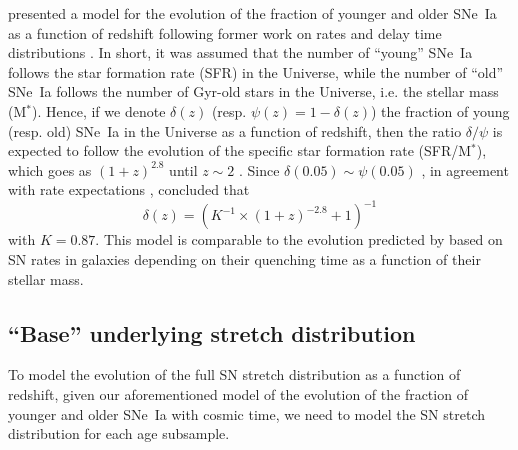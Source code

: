 \documentclass[]{aa} %
\newcommand{\nn}[1]{{\textcolor[rgb]{0.25, 0.50, 0}{#1}}}
\begin{document}
\cite{rigault2018} presented a model for the evolution of the fraction of
younger and older SNe~Ia as a function of redshift following former work on
rates and delay time distributions \citep[e.g.,][]{mannucci2005,
scannapieco2005, sullivan2006, aubourg2008, childress2014, maozmannucci2014}.
In short, it was assumed that the number of ``young'' SNe~Ia follows the star
formation \nn{rate} (SFR) in the Universe, while the number of ``old'' SNe~Ia
follows the number of Gyr-old stars in the Universe, i.e. the stellar mass
(M$^*$). Hence, if we denote $\delta(z)$ (resp. $\psi(z) = 1-\delta(z)$) the
fraction of young (resp. old) SNe~Ia in the Universe as a function of redshift,
then the ratio $\delta/\psi$ is expected to follow the evolution of the specific
star formation rate (SFR/M$^*$), which goes as $(1+z)^{2.8}$ until $z\sim2$
\citep[e.g.,][]{tasca2015}. Since $\delta(0.05) \sim \psi(0.05)$
\citep{rigault2013,rigault2018,wiseman2020}, in agreement with rate expectations
\citep{mannucci2006,rodney2014}, \cite{rigault2018} concluded that
\begin{equation}
    \label{eq:delta}
    \delta(z) = \left( K^{-1} \times (1+z)^{-2.8} +1 \right)^{-1}
\end{equation}
with $K=0.87$. This model is comparable to the evolution predicted by
\cite{childress2014} based on SN rates in galaxies depending on their quenching
time as a function of their stellar mass.

\subsection{``Base'' underlying stretch distribution}
\label{sec:basemodel}

To model the evolution of the \nn{full} SN stretch distribution as a function of redshift, given our aforementioned model of the evolution of the fraction of
younger and older SNe~Ia with cosmic time, we need to model the SN stretch distribution for each age
subsample. 
\end{document}

